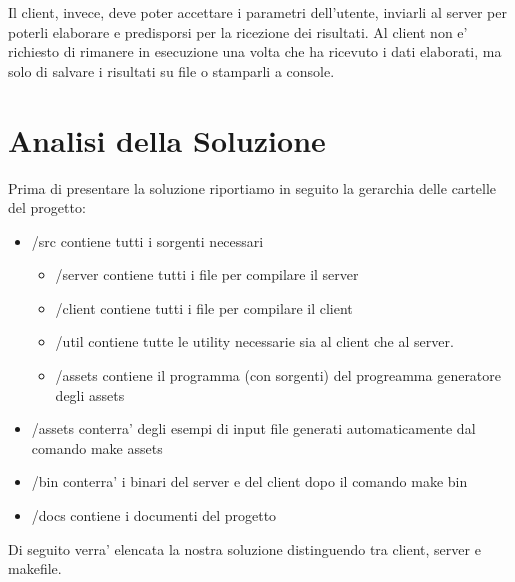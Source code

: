 \documentclass[12pt]{article}
\begin{document}
Il client, invece, deve poter accettare i parametri dell'utente, inviarli al server per poterli elaborare e predisporsi per la ricezione dei risultati. Al client non e' richiesto di rimanere in esecuzione una volta che ha ricevuto i dati elaborati, ma solo di salvare i risultati su file o stamparli a console.
\vspace*{2cm}

\section{Analisi della Soluzione}
Prima di presentare la soluzione riportiamo in seguito la gerarchia delle cartelle del progetto:
\begin{itemize}
    \item /src contiene tutti i sorgenti necessari
    \begin{itemize}
        \item /server contiene tutti i file per compilare il server
        \item /client contiene tutti i file per compilare il client
        \item /util contiene tutte le utility necessarie sia al client che al server.
        \item /assets contiene il programma (con sorgenti) del progreamma generatore degli assets
    \end{itemize}
    \item /assets conterra' degli esempi di input file generati automaticamente dal comando make assets
    \item /bin conterra' i binari del server e del client dopo il comando make bin
    \item /docs contiene i documenti del progetto
\end{itemize}

Di seguito verra' elencata la nostra soluzione distinguendo tra client, server e makefile.
\end{document}
